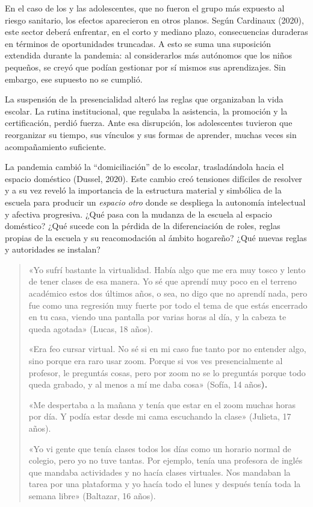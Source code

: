 En el caso de los y las adolescentes, que no fueron el grupo más expuesto al riesgo sanitario, los efectos aparecieron en otros planos. Según Cardinaux (2020), este sector deberá enfrentar, en el corto y mediano plazo, consecuencias duraderas en términos de oportunidades truncadas. A esto se suma una suposición extendida durante la pandemia: al considerarlos más autónomos que los niños pequeños, se creyó que podían gestionar por sí mismos sus aprendizajes. Sin embargo, ese supuesto no se cumplió.

La suspensión de la presencialidad alteró las reglas que organizaban la vida escolar. La rutina institucional, que regulaba la asistencia, la promoción y la certificación, perdió fuerza. Ante esa disrupción, los adolescentes tuvieron que reorganizar su tiempo, sus vínculos y sus formas de aprender, muchas veces sin acompañamiento suficiente.

La pandemia cambió la ``domiciliación'' de lo escolar, trasladándola hacia el espacio doméstico (Dussel, 2020). Este cambio creó tensiones difíciles de resolver y a su vez reveló la importancia de la estructura material y simbólica de la escuela para producir un \emph{espacio otro} donde se despliega la autonomía intelectual y afectiva progresiva. ¿Qué pasa con la mudanza de la escuela al espacio doméstico? ¿Qué sucede con la pérdida de la diferenciación de roles, reglas propias de la escuela y su reacomodación al ámbito hogareño? ¿Qué nuevas reglas y autoridades se instalan?

\begin{quote}
«Yo sufrí bastante la virtualidad. Había algo que me era muy tosco y lento de tener clases de esa manera. Yo sé que aprendí muy poco en el terreno académico estos dos últimos años, o sea, no digo que no aprendí nada, pero fue como una regresión muy fuerte por todo el tema de que estás encerrado en tu casa, viendo una pantalla por varias horas al día, y la cabeza te queda agotada» (Lucas, 18 años).

«Era feo cursar virtual. No sé si en mi caso fue tanto por no entender algo, sino porque era raro usar zoom. Porque si vos ves presencialmente al profesor, le preguntás cosas, pero por zoom no se lo preguntás porque todo queda grabado, y al menos a mí me daba cosa» (Sofía, 14 años\textbf{).}

«Me despertaba a la mañana y tenía que estar en el zoom muchas horas por día. Y podía estar desde mi cama escuchando la clase» (Julieta, 17 años).

«Yo vi gente que tenía clases todos los días como un horario normal de colegio, pero yo no tuve tantas. Por ejemplo, tenía una profesora de inglés que mandaba actividades y no hacía clases virtuales. Nos mandaban la tarea por una plataforma y yo hacía todo el lunes y después tenía toda la semana libre» (Baltazar, 16 años).
\end{quote}

